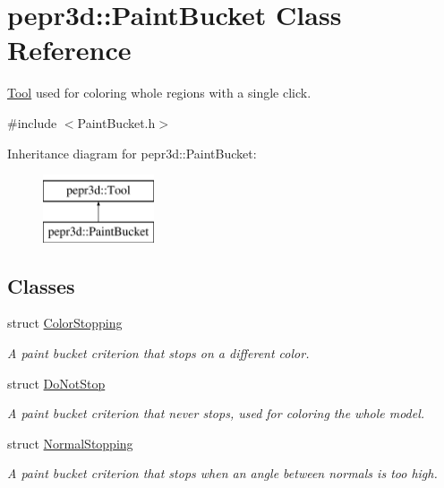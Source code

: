 \hypertarget{classpepr3d_1_1_paint_bucket}{}\section{pepr3d\+::Paint\+Bucket Class Reference}
\label{classpepr3d_1_1_paint_bucket}


\mbox{\hyperlink{classpepr3d_1_1_tool}{Tool}} used for coloring whole regions with a single click.  




{\ttfamily \#include $<$Paint\+Bucket.\+h$>$}

Inheritance diagram for pepr3d\+::Paint\+Bucket\+:\begin{figure}[H]
\begin{center}
\leavevmode
\includegraphics[height=2.000000cm]{classpepr3d_1_1_paint_bucket}
\end{center}
\end{figure}
\subsection*{Classes}
\begin{DoxyCompactItemize}
\item 
struct \mbox{\hyperlink{structpepr3d_1_1_paint_bucket_1_1_color_stopping}{Color\+Stopping}}
\begin{DoxyCompactList}\small\item\em A paint bucket criterion that stops on a different color. \end{DoxyCompactList}\item 
struct \mbox{\hyperlink{structpepr3d_1_1_paint_bucket_1_1_do_not_stop}{Do\+Not\+Stop}}
\begin{DoxyCompactList}\small\item\em A paint bucket criterion that never stops, used for coloring the whole model. \end{DoxyCompactList}\item 
struct \mbox{\hyperlink{structpepr3d_1_1_paint_bucket_1_1_normal_stopping}{Normal\+Stopping}}
\begin{DoxyCompactList}\small\item\em A paint bucket criterion that stops when an angle between normals is too high. \end{DoxyCompactList}\end{DoxyCompactItemize}
